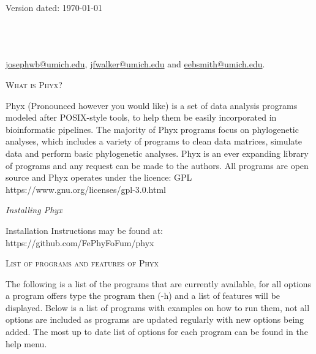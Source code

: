 \documentclass[12pt,letterpaper]{article}
\renewcommand{\section}[1]{%
\bigskip
\begin{center}
\begin{Large}
\normalfont\scshape #1
\medskip
\end{Large}
\end{center}}
\renewcommand{\subsection}[1]{%
\bigskip
\begin{center}
\begin{large}
\normalfont\itshape #1
\end{large}
\end{center}}
\begin{document}
\begin{flushright}
Version dated: \today
\end{flushright}
\bigskip

\\
\\
\\

\medskip
{} \href{josephwb@umich.edu}{josephwb@umich.edu}, \href{jfwalker@umich.edu}{jfwalker@umich.edu} and \href{eebsmith@umich.edu}{eebsmith@umich.edu}.\\
\medskip

\vspace{1in}

\section{What is Phyx?}\label{abstract}
Phyx (Pronounced however you would like) is a set of data analysis programs modeled after POSIX-style tools, to help them be easily incorporated in bioinformatic pipelines. The majority of Phyx programs focus on phylogenetic analyses, which includes a variety of programs to clean data matrices, simulate data and perform basic phylogenetic analyses. Phyx is an ever expanding library of programs and any request can be made to the authors. 
All programs are open source and Phyx operates under the licence: GPL https://www.gnu.org/licenses/gpl-3.0.html

\subsection{Installing Phyx}\label{introduction}
\begin{flushleft}
Installation Instructions may be found at: https://github.com/FePhyFoFum/phyx

\end{flushleft}
\section{List of programs and features of Phyx}

The following is a list of the programs that are currently available, for all options a program offers type the program then (-h) and a list of features will be displayed. Below is a list of programs with examples on how to run them, not all options are included as programs are updated regularly with new options being added. The most up to date list of options for each program can be found in the help menu.
\end{document}
